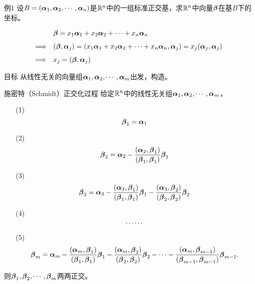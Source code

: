 \begin{frame}
  \begin{footnotesize}
    \begin{exampleblock}{例1}
      设$B=(\boldsymbol{\alpha}_1,\boldsymbol{\alpha}_2,\cdots,\boldsymbol{\alpha}_n)$是$\mathbb{R}^n$中的一组标准正交基，求$\mathbb{R}^n$中向量$\boldsymbol{\beta}$在基$B$下的坐标。
    \end{exampleblock}
    \jiename
    $$
    \begin{array}{rl}
    & \boldsymbol{\beta}=x_1\boldsymbol{\alpha}_1+x_2\boldsymbol{\alpha}_2+\cdots+x_n\boldsymbol{\alpha}_n\\[0.1in]
    \Longrightarrow&   (\boldsymbol{\beta},\boldsymbol{\alpha}_j)=(x_1\boldsymbol{\alpha}_1+x_2\boldsymbol{\alpha}_2+\cdots+x_n\boldsymbol{\alpha}_n,\boldsymbol{\alpha}_j)=x_j(\boldsymbol{\alpha}_j,\boldsymbol{\alpha}_j)\\[0.1in]
     \Longrightarrow& \displaystyle x_j =  (\boldsymbol{\beta},\boldsymbol{\alpha}_j) 
    \end{array}
     $$
    
  \end{footnotesize}
\end{frame}


\begin{frame}
  \begin{footnotesize}
    \begin{block}{目标}
      从线性无关的向量组$\boldsymbol{\alpha}_1,\boldsymbol{\alpha}_2,\cdots,\boldsymbol{\alpha}_m$出发，构造。
    \end{block}
  \end{footnotesize}
\end{frame}


\begin{frame}
  \begin{footnotesize}
    \begin{block}{施密特（Schmidt）正交化过程}
      给定$\mathbb{R}^n$中的线性无关组$\boldsymbol{\alpha}_1,\boldsymbol{\alpha}_2,\cdots,\boldsymbol{\alpha}_m$， \pause
      \begin{itemize}
      \item[(1)] $$\boldsymbol{\beta}_1=\boldsymbol{\alpha}_1$$
      \item[(2)] 
        $$
        \boldsymbol{\beta}_2=\boldsymbol{\alpha}_2-\frac{(\boldsymbol{\alpha}_2,\boldsymbol{\beta}_1)}{(\boldsymbol{\beta}_1,\boldsymbol{\beta}_1)}\boldsymbol{\beta}_1
        $$
      \item[(3)] 
        $$
        \boldsymbol{\beta}_3=\boldsymbol{\alpha}_3-\frac{(\boldsymbol{\alpha}_3,\boldsymbol{\beta}_1)}{(\boldsymbol{\beta}_1,\boldsymbol{\beta}_1)}\boldsymbol{\beta}_1
        -\frac{(\boldsymbol{\alpha}_3,\boldsymbol{\beta}_2)}{(\boldsymbol{\beta}_2,\boldsymbol{\beta}_2)}\boldsymbol{\beta}_2
        $$
       \item[(4)]  $$\cdots\cdots$$
      \item[(5)] 
        $$
        \boldsymbol{\beta}_m=\boldsymbol{\alpha}_m-\frac{(\boldsymbol{\alpha}_m,\boldsymbol{\beta}_1)}{(\boldsymbol{\beta}_1,\boldsymbol{\beta}_1)}\boldsymbol{\beta}_1
        -\frac{(\boldsymbol{\alpha}_m,\boldsymbol{\beta}_2)}{(\boldsymbol{\beta}_2,\boldsymbol{\beta}_2)}\boldsymbol{\beta}_2
        -\cdots
        -\frac{(\boldsymbol{\alpha}_m,\boldsymbol{\beta}_{m-1})}{(\boldsymbol{\beta}_{m-1},\boldsymbol{\beta}_{m-1})}\boldsymbol{\beta}_{m-1}.
        $$
      \end{itemize}
      则$\boldsymbol{\beta}_1,\boldsymbol{\beta}_2,\cdots,\boldsymbol{\beta}_m$两两正交。
    \end{block}
  \end{footnotesize}
\end{frame}


